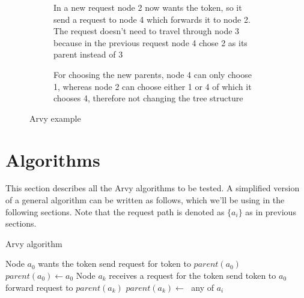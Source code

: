 \documentclass[a4paper, oneside]{discothesis}
\begin{document}
\begin{figure}[]
\begin{subfigure}[t]{0.5\textwidth}
\centering
{}
\caption{In a new request node 2 now wants the token, so it send a request to node 4 which forwards it to node 2. The request doesn't need to travel through node 3 because in the previous request node 4 chose 2 as its parent instead of 3}
\end{subfigure}
\quad
\begin{subfigure}[t]{0.5\textwidth}
\centering
{}
\caption{For choosing the new parents, node 4 can only choose 1, whereas node 2 can choose either 1 or 4 of which it chooses 4, therefore not changing the tree structure}
\end{subfigure}
\caption{Arvy example}
\label{fig:arvy}
\end{figure}


\chapter{Algorithms}

This section describes all the Arvy algorithms to be tested. A simplified version of a general algorithm can be written as follows, which we'll be using in the following sections. Note that the request path is denoted as $\{a_{i}\}$ as in previous sections.

\begin{algorithm}
\caption{Arvy algorithm}
\label{arvyalg}
\begin{algorithmic}
\Comment Node $a_{0}$ wants the token
    \State send request for token to $parent(a_{0})$
    \State $parent(a_{0})\gets a_{0}$
\EndIf
\EndFunction
{}
\Comment Node $a_{k}$ receives a request for the token
    \State send token to $a_{0}$
\Else
    \State forward request to $parent(a_{k})$
\EndIf
\State $parent(a_{k})\gets\;$
\EndFunction
{}
\State\Return any of $a_{i}$
\EndFunction
\end{algorithmic}
\end{algorithm}
\end{document}
